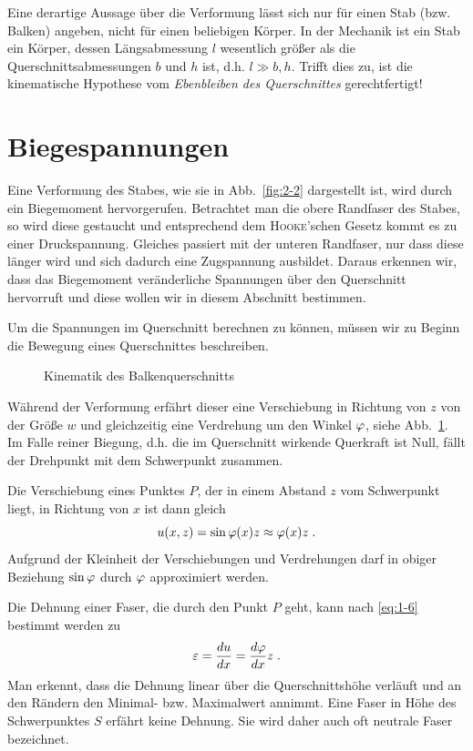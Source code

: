 Eine derartige Aussage über die Verformung lässt sich nur für einen Stab (bzw. Balken) angeben, nicht für einen beliebigen Körper.
In der Mechanik ist ein Stab ein Körper, dessen Längsabmessung $l$ wesentlich größer als die Querschnittsabmessungen $b$ und $h$ ist, d.h. $l\gg b,h$.
Trifft dies zu, ist die kinematische Hypothese vom \emph{Ebenbleiben des Querschnittes} gerechtfertigt!

\section{Biegespannungen}

Eine Verformung des Stabes, wie sie in Abb.~\ref{fig:2-2} dargestellt ist, wird durch ein Biegemoment hervorgerufen.
Betrachtet man die obere Randfaser des Stabes, so wird diese gestaucht und entsprechend dem \textsc{Hooke}'schen Gesetz kommt es zu einer Druckspannung.
Gleiches passiert mit der unteren Randfaser, nur dass diese länger wird und sich dadurch eine Zugspannung ausbildet.
Daraus erkennen wir, dass das Biegemoment veränderliche Spannungen über den Querschnitt hervorruft und diese wollen wir in diesem Abschnitt bestimmen. 

Um die Spannungen im Querschnitt berechnen zu können, müssen wir zu Beginn die Bewegung eines Querschnittes beschreiben. 
%
\begin{figure}[h!]
	\centering
	
	\caption{Kinematik des Balkenquerschnitts}
	\label{fig:2-3}
\end{figure}
%
Während der Verformung erfährt dieser eine Verschiebung in Richtung von $z$ von der Größe $w$ und gleichzeitig eine Verdrehung um den Winkel $\varphi$, siehe Abb.~\ref{fig:2-3}.
Im Falle reiner Biegung, d.h. die im Querschnitt wirkende Querkraft ist Null, fällt der Drehpunkt mit dem Schwerpunkt zusammen. 

Die Verschiebung eines Punktes $P$, der in einem Abstand $z$ vom Schwerpunkt liegt, in Richtung von $x$ ist dann gleich
%
\begin{equation}
u(x,z) = \sin\varphi(x)z \approx \varphi(x)z \; .
\label{eq:2-1}
\end{equation}
%
Aufgrund der Kleinheit der Verschiebungen und Verdrehungen darf in obiger Beziehung $\sin\varphi$ durch $\varphi$ approximiert werden.

Die Dehnung einer Faser, die durch den Punkt $P$ geht, kann nach \eqref{eq:1-6} bestimmt werden zu
%
\begin{equation}
\varepsilon = \dfrac{du}{dx} = \dfrac{d\varphi}{dx}z \; .
\label{eq:2-2}
\end{equation}
%
Man erkennt, dass die Dehnung linear über die Querschnittshöhe verläuft und an den Rändern den Minimal- bzw. Maximalwert annimmt.
Eine Faser in Höhe des Schwerpunktes $S$ erfährt keine Dehnung.
Sie wird daher auch oft neutrale Faser bezeichnet.

